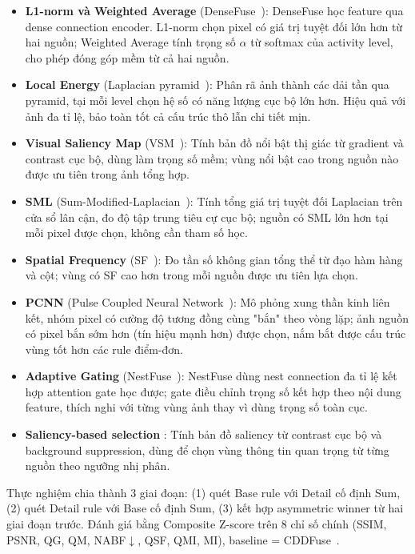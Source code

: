 \begin{itemize}[leftmargin=1.5em, itemsep=2pt, topsep=4pt]
  \item \textbf{L1-norm và Weighted Average} (DenseFuse~\cite{li2018densefuse}): DenseFuse học feature qua dense connection encoder. L1-norm chọn pixel có giá trị tuyệt đối lớn hơn từ hai nguồn; Weighted Average tính trọng số $\alpha$ từ softmax của activity level, cho phép đóng góp mềm từ cả hai nguồn.
  \item \textbf{Local Energy} (Laplacian pyramid~\cite{burt1983laplacian}): Phân rã ảnh thành các dải tần qua pyramid, tại mỗi level chọn hệ số có năng lượng cục bộ lớn hơn. Hiệu quả với ảnh đa tỉ lệ, bảo toàn tốt cả cấu trúc thô lẫn chi tiết mịn.
  \item \textbf{Visual Saliency Map} (VSM~\cite{wang2008vsm}): Tính bản đồ nổi bật thị giác từ gradient và contrast cục bộ, dùng làm trọng số mềm; vùng nổi bật cao trong nguồn nào được ưu tiên trong ảnh tổng hợp.
  \item \textbf{SML} (Sum-Modified-Laplacian~\cite{huang2007sml}): Tính tổng giá trị tuyệt đối Laplacian trên cửa sổ lân cận, đo độ tập trung tiêu cự cục bộ; nguồn có SML lớn hơn tại mỗi pixel được chọn, không cần tham số học.
  \item \textbf{Spatial Frequency} (SF~\cite{eskicioglu1995sf}): Đo tần số không gian tổng thể từ đạo hàm hàng và cột; vùng có SF cao hơn trong mỗi nguồn được ưu tiên lựa chọn.
  \item \textbf{PCNN} (Pulse Coupled Neural Network~\cite{eckhorn1990pcnn}): Mô phỏng xung thần kinh liên kết, nhóm pixel có cường độ tương đồng cùng "bắn" theo vòng lặp; ảnh nguồn có pixel bắn sớm hơn (tín hiệu mạnh hơn) được chọn, nắm bắt được cấu trúc vùng tốt hơn các rule điểm-đơn.
  \item \textbf{Adaptive Gating} (NestFuse~\cite{li2020nestfuse}): NestFuse dùng nest connection đa tỉ lệ kết hợp attention gate học được; gate điều chỉnh trọng số kết hợp theo nội dung feature, thích nghi với từng vùng ảnh thay vì dùng trọng số toàn cục.
  \item \textbf{Saliency-based selection} \cite{liu2016saliency}: Tính bản đồ saliency từ contrast cục bộ và background suppression, dùng để chọn vùng thông tin quan trọng từ từng nguồn theo ngưỡng nhị phân.
\end{itemize}

Thực nghiệm chia thành 3 giai đoạn: (1) quét Base rule với Detail cố định Sum, (2) quét Detail rule với Base cố định Sum, (3) kết hợp asymmetric winner từ hai giai đoạn trước. Đánh giá bằng Composite Z-score trên 8 chỉ số chính (SSIM, PSNR, QG, QM, NABF$\downarrow$, QSF, QMI, MI), baseline = CDDFuse~\cite{zhao2023cddfuse}.

